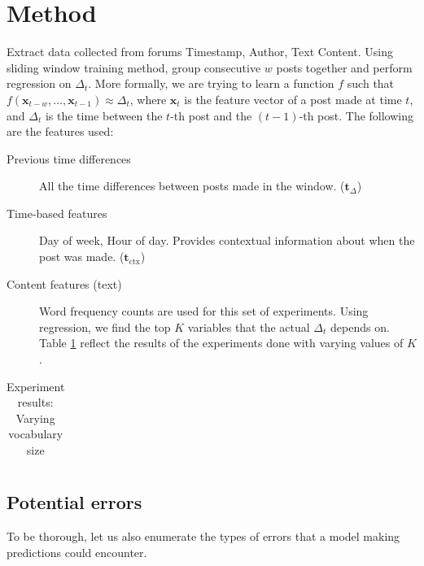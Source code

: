 \documentclass[12 pt]{article}
\begin{document}
\newcommand{\vocab}{\mathbf{v}}
\newcommand{\dtvec}{\mathbf{t}_\Delta}
\newcommand{\ctxvec}{\mathbf{t}_\text{ctx}}
\newcommand{\dt}{\Delta_t}
\newcommand{\prerror}{Pr_{error}}
\newcommand{\fvec}{\mathbf{x}}

\section{Method}

Extract data collected from forums Timestamp, Author, Text Content. Using sliding window training method, group consecutive $w$ posts together and perform regression on $\dt$. More formally, we are trying to learn a function $f$ such that $f(\fvec_{t-w},\hdots, \fvec_{t-1}) \approx \Delta_{t}$, where $\fvec_t$ is the feature vector of a post made at time $t$, and $\dt$ is the time between the $t$-th post and the $(t-1)$-th post. The following are the features used:

\begin{description}
	\item[Previous time differences] All the time differences between posts made in the window. ($\dtvec$)
	\item[Time-based features] Day of week, Hour of day. Provides contextual information about when the post was made. ($\ctxvec$)
	
	\item[Content features (text)]
		Word frequency counts are used for this set of experiments. Using regression, we find the top $K$ variables that the actual $\dt$ depends on. Table \ref{vocab_exp} reflect the results of the experiments done with varying values of $K$.

\end{description}


\begin{table}
	\footnotesize
	\begin{centering}
	\begin{tabular}{|l|c|c|c|c|c|c|c|c|}
	\hline
	
	\hline
	\end{tabular}
	\caption{Experiment results: Varying vocabulary size}
	\label{vocab_exp}
\end{centering}
\end{table}

\subsection{Potential errors}
To be thorough, let us also enumerate the types of errors that a model making predictions could encounter.
\end{document}
